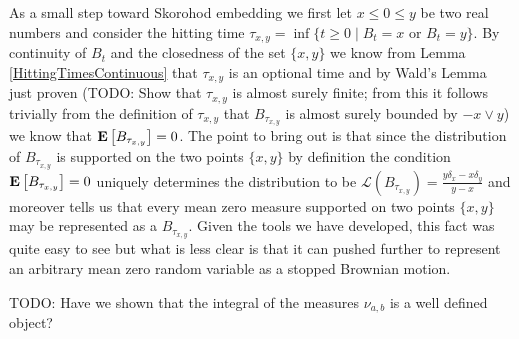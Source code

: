 As a small step toward Skorohod embedding we first let $x \leq 0 \leq
y$ be two real numbers and consider the hitting time $\tau_{x,y} =
\inf \lbrace t \geq 0 \mid B_t = x \text{ or } B_t = y\rbrace$.  By
  continuity of $B_t$ and the closedness of the set $\lbrace x,y
  \rbrace$ we know from Lemma \ref{HittingTimesContinuous} that
  $\tau_{x,y}$ is an optional time and by Wald's Lemma just proven
  (TODO: Show that $\tau_{x,y}$ is almost surely finite; from this it
  follows trivially from the definition of $\tau_{x,y}$ that
  $B_{\tau_{x,y}}$ is almost surely bounded by $-x 
\vee y$) we
  know that $\textbf{E}\left[B_{\tau_{x,y}}\right] = 0$.  The point to bring
  out is that since the distribution of $B_{\tau_{x,y}}$ is supported
  on the two points $\lbrace x,y \rbrace$ by definition the condition
  $\textbf{E}\left[B_{\tau_{x,y}}\right] = 0$ uniquely determines the
  distribution to be $\mathcal{L}(B_{\tau_{x,y}}) = \frac{y \delta_x - x
    \delta_y}{y-x}$ and moreover tells us that every mean zero measure
  supported on two points $\lbrace x,y \rbrace$ may be represented as
  a $B_{\tau_{x,y}}$.  
Given the tools we have developed, this fact was
  quite easy to see but what is less clear is that it can pushed further to
  represent an arbitrary mean zero random variable as a stopped
  Brownian motion.

TODO:  Have we shown that the integral of the measures $\nu_{a,b}$ is
a well defined object?

